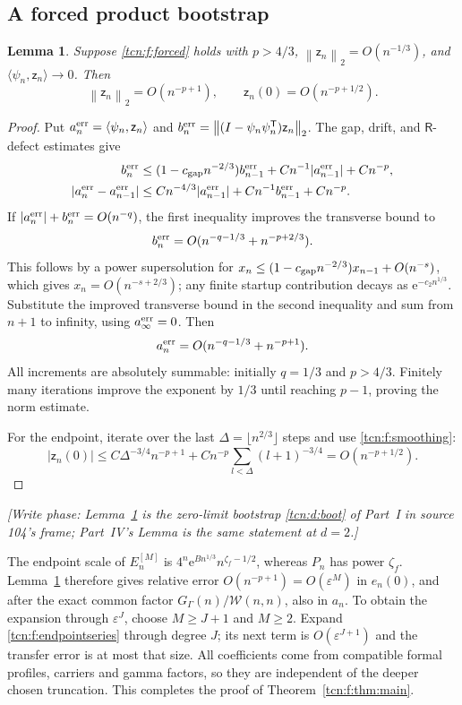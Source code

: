 \documentclass[11pt,letterpaper]{article}
\newcommand{\norm}[1]{\left\lVert#1\right\rVert}
\newcommand{\ip}[2]{\langle#1,#2\rangle}
\newcommand{\eps}{\varepsilon}
\newcommand{\ee}{\mathrm e}
\newtheorem{lemma}[theorem]{Lemma}
\theoremstyle{remark}
\begin{document}
\subsection{A forced product bootstrap}
\begin{lemma}\label{tcn:f:lem:forced}
Suppose \eqref{tcn:f:forced} holds with $p>4/3$, $\norm{\mathsf z_n}_2=O(n^{-1/3})$, and $\ip{\psi_n}{\mathsf z_n}\to0$. Then
\[
 \norm{\mathsf z_n}_2=O(n^{-p+1}),\qquad \mathsf z_n(0)=O(n^{-p+1/2}).
\]
\end{lemma}
\begin{proof}
Put $a^{\rm err}_n=\ip{\psi_n}{\mathsf z_n}$ and $b^{\rm err}_n=\norm{(I-\psi_n\psi_n^{\mathsf T})\mathsf z_n}_2$. The gap, drift, and $\mathsf R$-defect estimates give
\begin{align}
 b^{\rm err}_n&\le(1-c_{\rm gap}n^{-2/3})b^{\rm err}_{n-1}+Cn^{-1}|a^{\rm err}_{n-1}|+Cn^{-p},\notag\\
 |a^{\rm err}_n-a^{\rm err}_{n-1}|&\le Cn^{-4/3}|a^{\rm err}_{n-1}|+Cn^{-1}b^{\rm err}_{n-1}+Cn^{-p}.\label{tcn:f:bootstrap}
\end{align}
If $|a^{\rm err}_n|+b^{\rm err}_n=O(n^{-q})$, the first inequality improves the transverse bound to
\[
 b^{\rm err}_n=O(n^{-q-1/3}+n^{-p+2/3}).
\]
This follows by a power supersolution for
$x_n\le(1-c_{\rm gap}n^{-2/3})x_{n-1}+O(n^{-s})$, which gives $x_n=O(n^{-s+2/3})$; any finite startup contribution decays as $\ee^{-c_2n^{1/3}}$. Substitute the improved transverse bound in the second inequality and sum from $n+1$ to infinity, using $a^{\rm err}_\infty=0$. Then
\[
 a^{\rm err}_n=O(n^{-q-1/3}+n^{-p+1}).
\]
All increments are absolutely summable: initially $q=1/3$ and $p>4/3$. Finitely many iterations improve the exponent by $1/3$ until reaching $p-1$, proving the norm estimate.

For the endpoint, iterate over the last $\Delta=\lfloor n^{2/3}\rfloor$ steps and use \eqref{tcn:f:smoothing}:
\[
 |\mathsf z_n(0)|\le C\Delta^{-3/4}n^{-p+1}
       +Cn^{-p}\sum_{l<\Delta}(l+1)^{-3/4}
 =O(n^{-p+1/2}).
\]
\end{proof}
\emph{[Write phase: Lemma~\ref{tcn:f:lem:forced} is the zero-limit bootstrap \eqref{tcn:d:boot} of Part~I in source 104's frame; Part~IV's Lemma is the same statement at $d=2$.]}

The endpoint scale of $E_n^{[M]}$ is $4^n\ee^{Bn^{1/3}}n^{\zeta_f-1/2}$, whereas $P_n$ has power $\zeta_f$. Lemma~\ref{tcn:f:lem:forced} therefore gives relative error $O(n^{-p+1})=O(\eps^M)$ in $e_n(0)$, and after the exact common factor $G_\Gamma(n)/\mathcal W(n,n)$, also in $a_n$. To obtain the expansion through $\eps^J$, choose $M\ge J+1$ and $M\ge2$. Expand \eqref{tcn:f:endpointseries} through degree $J$; its next term is $O(\eps^{J+1})$ and the transfer error is at most that size. All coefficients come from compatible formal profiles, carriers and gamma factors, so they are independent of the deeper chosen truncation. This completes the proof of Theorem~\ref{tcn:f:thm:main}.
\end{document}
